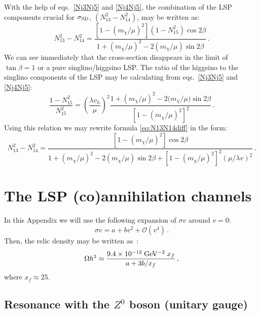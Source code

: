 \documentclass[12pt,twoside]{article}
\begin{document}
With the help of eqs.~\eqref{Nj3Nj5} and \eqref{Nj4Nj5}, 
the combination of the LSP components crucial for $\sigma_{\rm SD}$,
$(N_{13}^2-N_{14}^2)$, may be written as:  
%
\begin{equation}
\label{eq:N13N14diff}
N_{13}^2-N_{14}^2=\frac{\left[1-\left(m_\chi/\mu\right)^2\right](1-N_{15}^2)\cos2\beta}{1+\left(m_\chi/\mu\right)^2-2\left(m_\chi/\mu\right)\sin2\beta}\,.
\end{equation}
%
We can see immediately that the cross-section disappears in the limit 
of $\tan\beta=1$ or a pure singlino/higgsino LSP. 
The ratio of the higgsino to the singlino components of the LSP
may be calculating from eqs.~\eqref{Nj3Nj5} and \eqref{Nj4Nj5}:
%
\begin{equation}
\label{Higgsino/singlino}
\frac{1-N_{15}^2}{N_{15}^2}
=
\left(\frac{\lambda v_h}{\mu}\right)^{\!\!2}
\frac{1+\left(m_\chi/\mu\right)^2-2{(m_\chi}/{\mu})\sin2\beta}
{\left[1-\left({m_\chi}/{\mu}\right)^2\right]^2}
\,.
\end{equation}
%
Using this relation we may rewrite formula \eqref{eq:N13N14diff} in the form:
%
\begin{equation}
\label{eq:N13N14diff_lambda}
N_{13}^2-N_{14}^2=\frac{\left[1-\left(m_\chi/\mu\right)^2\right]
\cos2\beta}{1+\left(m_\chi/\mu\right)^2-2\left(m_\chi/\mu\right)\sin2\beta
+\left[1-\left(m_\chi/\mu\right)^2\right]^2
\left({\mu}/{\lambda v}\right)^2}\,.
\end{equation}
%


\section{The LSP (co)annihilation channels}
\label{App:annihilation}

In this Appendix we will use the following expansion of $\sigma v$ around $v=0$:
%
\begin{equation}\label{sigmaV_expansion}
\sigma v=a+bv^2+\mathcal{O}(v^4)\,.
\end{equation}
%
Then, the relic density may be written as~\cite{Griest}:
%
\begin{equation}
\label{om_ab}
\Omega h^2\approx
\frac{9.4\times10^{-12}\;{\rm GeV^{-2}}\;x_f}{a+3b/x_f}\,,
\end{equation}
%
where $x_f\approx 25$.

\subsection{Resonance with the $Z^0$ boson (unitary gauge) \label{App:res_Z}}
\end{document}
